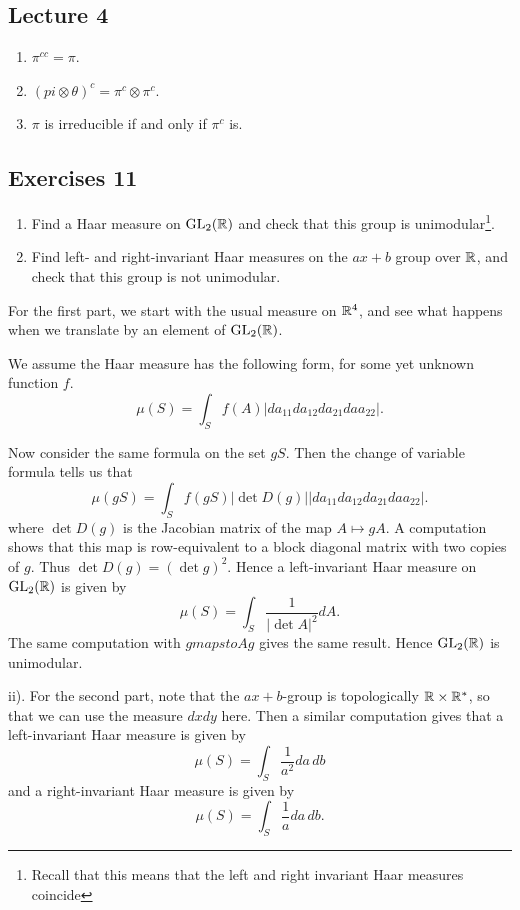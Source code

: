 \documentclass[11pt, english]{article}
\begin{document}
\subsection{Lecture 4}

\begin{exc}
  \begin{enumerate}
  \item $\pi^{cc}=\pi$.
\item $(pi \otimes \theta)^c = \pi^c \otimes \pi^c$.
\item $\pi$ is irreducible if and only if $\pi^c$ is.
  \end{enumerate}
\end{exc}

\subsection{Exercises 11}

\begin{exc}
  \begin{enumerate}
  \item Find a Haar measure on $\operatorname{GL}_2(\mathbb{R})$ and check that this group is unimodular\footnote{Recall that this means that the left and right invariant Haar measures coincide}.
\item Find left- and right-invariant Haar measures on the $ax+b$ group over $\mathbb{R}$, and check that this group is not unimodular.
  \end{enumerate}
\end{exc}
\begin{sol}
For the first part, we start with the usual measure on $\mathbb{R}^4$, and see what happens when we translate by an element of $\operatorname{GL}_2(\mathbb{R})$. 

We assume the Haar measure has the following form, for some yet unknown function $f$.
$$
\mu(S) = \int_S f(A) \lvert da_{11} d a_{12} da_{21} da a_{22} \rvert.
$$

Now consider the same formula on the set $gS$. Then the change of variable formula tells us that
$$
\mu(gS) = \int_S f(gS) \lvert \det D(g) \rvert \lvert da_{11} d a_{12} da_{21} da a_{22} \rvert.
$$
where $\det D(g)$ is the Jacobian matrix of the map $A \mapsto gA$. A computation shows that this map is row-equivalent to a block diagonal matrix with two copies of $g$. Thus $\det D(g) = (\det g)^2$. Hence a left-invariant Haar measure on $\operatorname{GL}_2(\mathbb{R})$ is given by
$$
\mu(S) = \int_S \frac{1}{\lvert \det A\rvert ^2} dA.
$$
The same computation with $g mapsto Ag$ gives the same result. Hence $\operatorname{GL}_2(\mathbb{R})$ is unimodular.

ii). For the second part, note that the $ax+b$-group is topologically $\mathbb{R} \times \mathbb{R}^\ast$, so that we can use the measure $dxdy$ here. Then a similar computation gives that a left-invariant Haar measure is given by
$$
\mu(S) = \int_S \frac{1}{a^2} da\, db
$$
and a right-invariant Haar measure is given by
$$
\mu(S) = \int_S \frac{1}{a} da\, db.
$$
\end{sol}
\end{document}

